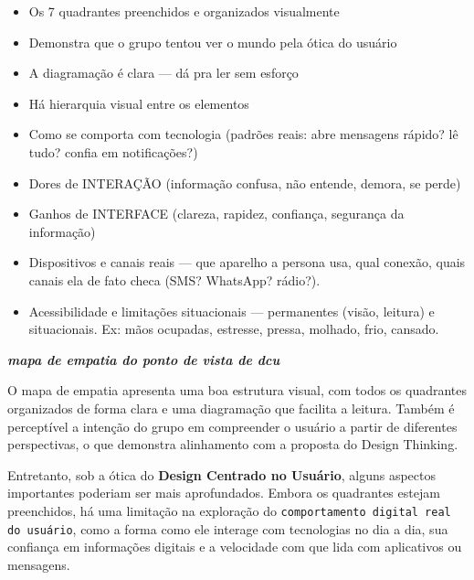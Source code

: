\documentclass[
  sigconf,
  nonacm, %
  language=portuguese
]{acmart}
\begin{document}
\begin{itemize}[leftmargin=14pt,itemsep=1pt,topsep=3pt,parsep=0pt]
  \item[\textcolor{cgood}{$\checkmark$}] {\small\textcolor{cgood}{Os 7 quadrantes preenchidos e organizados visualmente}}
  \item[\textcolor{cgood}{$\checkmark$}] {\small\textcolor{cgood}{Demonstra que o grupo tentou ver o mundo pela ótica do usuário}}
  \item[\textcolor{cgood}{$\checkmark$}] {\small\textcolor{cgood}{A diagramação é clara — dá pra ler sem esforço}}
  \item[\textcolor{cgood}{$\checkmark$}] {\small\textcolor{cgood}{Há hierarquia visual entre os elementos}}
  \item[\textcolor{cgood}{$\checkmark$}] {\small\textcolor{cgood}{Como se comporta com tecnologia (padrões reais: abre mensagens rápido? lê tudo? confia em notificações?)}}
  \item[\textcolor{cgood}{$\checkmark$}] {\small\textcolor{cgood}{Dores de INTERAÇÃO (informação confusa, não entende, demora, se perde)}}
  \item[\textcolor{cgood}{$\checkmark$}] {\small\textcolor{cgood}{Ganhos de INTERFACE (clareza, rapidez, confiança, segurança da informação)}}
  \item[\textcolor{cgood}{$\checkmark$}] {\small\textcolor{cgood}{Dispositivos e canais reais — que aparelho a persona usa, qual conexão, quais canais ela de fato checa (SMS? WhatsApp? rádio?).}}
  \item[\textcolor{cgood}{$\checkmark$}] {\small\textcolor{cgood}{Acessibilidade e limitações situacionais — permanentes (visão, leitura) e situacionais. Ex: mãos ocupadas, estresse, pressa, molhado, frio, cansado.}}
\end{itemize}

\textit{\textbf{mapa de empatia do ponto de vista de dcu}}

O mapa de empatia apresenta uma boa estrutura visual, com todos os quadrantes organizados de forma clara e uma diagramação que facilita a leitura. Também é perceptível a intenção do grupo em compreender o usuário a partir de diferentes perspectivas, o que demonstra alinhamento com a proposta do Design Thinking.

Entretanto, sob a ótica do \textbf{Design Centrado no Usuário}, alguns aspectos importantes poderiam ser mais aprofundados. Embora os quadrantes estejam preenchidos, há uma limitação na exploração do \texttt{comportamento digital real do usuário}, como a forma como ele interage com tecnologias no dia a dia, sua confiança em informações digitais e a velocidade com que lida com aplicativos ou mensagens.
\end{document}
